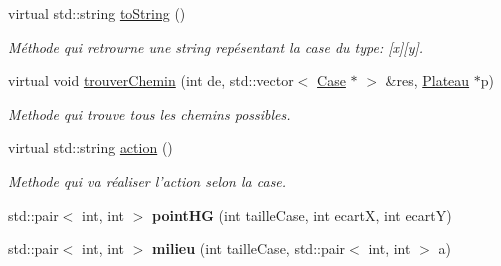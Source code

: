 \begin{DoxyCompactItemize}
\item 
virtual std\-::string \hyperlink{classCase_ad09ca1072f39bcacf06459fc03f026ae}{to\-String} ()
\begin{DoxyCompactList}\small\item\em \-Méthode qui retrourne une string repésentant la case du type\-: \mbox{[}x\mbox{]}\mbox{[}y\mbox{]}. \end{DoxyCompactList}\item 
virtual void \hyperlink{classCase_affe73b57a2c81e2f09dc5db45893db3c}{trouver\-Chemin} (int de, std\-::vector$<$ \hyperlink{classCase}{\-Case} $\ast$ $>$ \&res, \hyperlink{classPlateau}{\-Plateau} $\ast$p)
\begin{DoxyCompactList}\small\item\em \-Methode qui trouve tous les chemins possibles. \end{DoxyCompactList}\item 
\hypertarget{classCase_acdbbc0ad8422141cdbf2e647d1ba56e1}{virtual std\-::string \hyperlink{classCase_acdbbc0ad8422141cdbf2e647d1ba56e1}{action} ()}\label{classCase_acdbbc0ad8422141cdbf2e647d1ba56e1}

\begin{DoxyCompactList}\small\item\em \-Methode qui va réaliser l'action selon la case. \end{DoxyCompactList}\item 
\hypertarget{classCase_ae6ce55820f949e5fae8dbeb62d298291}{std\-::pair$<$ int, int $>$ {\bfseries point\-H\-G} (int taille\-Case, int ecart\-X, int ecart\-Y)}\label{classCase_ae6ce55820f949e5fae8dbeb62d298291}

\item 
\hypertarget{classCase_a48b794ecbea4155843ce09f53e280237}{std\-::pair$<$ int, int $>$ {\bfseries milieu} (int taille\-Case, std\-::pair$<$ int, int $>$ a)}\label{classCase_a48b794ecbea4155843ce09f53e280237}


\end{DoxyCompactItemize}
